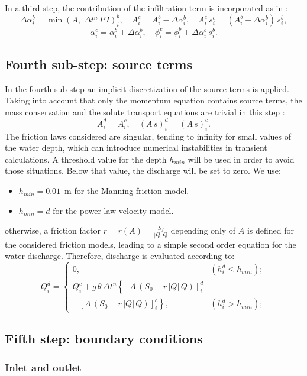 \documentclass[review,authoryear]{elsarticle}
\newcommand{\eq}[2]{\begin{equation}\label{#2}#1\end{equation}}
\newcommand{\PA}[1] {\left(#1\right)}
\newcommand{\C}[1] {\left[#1\right]}
\begin{document}
In a third step, the contribution of the infiltration term is incorporated as
in \cite{JaviSurcos1}:
\[
	\Delta\alpha_i^b=\min(A,\;\Delta t^n\,P\,I)_i^b,\quad
	A_i^c=A_i^b-\Delta\alpha_i^b,\quad
	A_i^c\,s_i^c=\PA{A_i^b-\Delta\alpha_i^b}\,s_i^b,
\]
\eq
{
	\alpha_i^c=\alpha_i^b+\Delta\alpha_i^b,\quad
	\phi_i^c=\phi_i^b+\Delta\alpha_i^b\,s_i^b.
}{EqInfiltracionNumerica}

\subsection{Fourth sub-step: source terms}

In the fourth sub-step an implicit discretization of the source terms is
applied. Taking into account that only the momentum equation contains source
terms, the mass conservation and the solute transport equations are trivial in
this step :
\eq{A_i^d=A_i^c,\quad (A\,s)_i^d=(A\,s)_i^c.}{EqSolvCA}
The friction laws considered are singular, tending to infinity for small values
of the water depth, which can introduce numerical instabilities in transient
calculations. A  threshold value for the depth $h_{min}$ will be used in order
to avoid those situations. Below that value, the discharge will be set to zero.
We use:
\begin{itemize}
\item $h_{min}=0.01$~m for the Manning friction model.
\item $h_{min}=d$ for the power law velocity model.
\end{itemize}
otherwise, a friction factor $r=r(A)=\frac{S_f}{|Q|\,Q}$ depending only of $A$
is defined for the considered friction models, leading to a simple second order
equation for the water discharge. Therefore, discharge is evaluated according
to:
\eq
{
	Q_i^d=\left\{\begin{array}{cc}0,&\PA{h_i^d\leq h_{min}};\\
	Q_i^c+g\,\theta\,\Delta t^n\left\{\C{A\,\PA{S_0-r\,|Q|\,Q}}_i^d\right.\\
	\left.-\C{A\,\PA{S_0-r\,|Q|\,Q}}_i^c\right\},&
	\PA{h_i^d>h_{min}};\end{array}\right.
}{EqSolvCQ}

\subsection{Fifth step: boundary conditions}

\subsubsection{Inlet and outlet}
\end{document}
